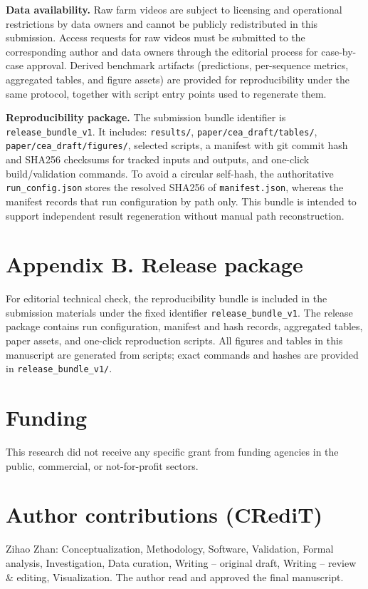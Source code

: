 \documentclass[5p,twocolumn,a4paper]{elsarticle}
\begin{document}
\textbf{Data availability.} Raw farm videos are subject to licensing and operational restrictions by data owners and cannot be publicly redistributed in this submission. Access requests for raw videos must be submitted to the corresponding author and data owners through the editorial process for case-by-case approval. Derived benchmark artifacts (predictions, per-sequence metrics, aggregated tables, and figure assets) are provided for reproducibility under the same protocol, together with script entry points used to regenerate them.

\textbf{Reproducibility package.} The submission bundle identifier is \texttt{release\_bundle\_v1}. It includes: \texttt{results/}, \texttt{paper/cea\_draft/tables/}, \texttt{paper/cea\_draft/figures/}, selected scripts, a manifest with git commit hash and SHA256 checksums for tracked inputs and outputs, and one-click build/validation commands. To avoid a circular self-hash, the authoritative \texttt{run\_config.json} stores the resolved SHA256 of \texttt{manifest.json}, whereas the manifest records that run configuration by path only. This bundle is intended to support independent result regeneration without manual path reconstruction.

\section*{Appendix B. Release package}
For editorial technical check, the reproducibility bundle is included in the submission materials under the fixed identifier \texttt{release\_bundle\_v1}.
The release package contains run configuration, manifest and hash records, aggregated tables, paper assets, and one-click reproduction scripts.
All figures and tables in this manuscript are generated from scripts; exact commands and hashes are provided in \texttt{release\_bundle\_v1/}.

\section*{Funding}
This research did not receive any specific grant from funding agencies in the public, commercial, or not-for-profit sectors.

\section*{Author contributions (CRediT)}
Zihao Zhan: Conceptualization, Methodology, Software, Validation, Formal analysis, Investigation, Data curation, Writing -- original draft, Writing -- review \& editing, Visualization. The author read and approved the final manuscript.
\end{document}
